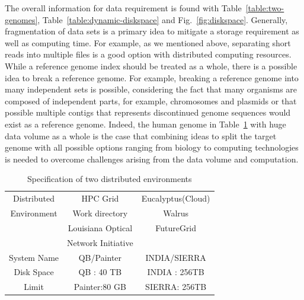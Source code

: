 \documentclass{acm_proc_article-sp}
\begin{document}
The overall information for data requirement is found with Table~\ref{table:two-genomes}, 
Table~\ref{table:dynamic-diskspace} and Fig.~\ref{fig:diskspace}. Generally, fragmentation 
of data sets is a primary idea to mitigate a storage requirement as well as computing time.  
For example, as we mentioned above, separating short reads into multiple files is a good 
option with distributed computing resources.  While a reference genome index should be 
treated as a whole, there is a possible idea to break a reference genome.  For example, 
breaking a reference genome into many independent sets is possible, considering the fact 
that many organisms are composed of independent parts, for example, chromosomes and 
plasmids or that possible multiple contigs that represents discontinued genome sequences
 would exist as a reference genome.  Indeed, the human genome in Table~\ref{table:two-systems} 
 with huge data volume as a whole is the case that combining ideas to split the target genome 
 with all possible options ranging from biology to computing technologies is needed to
 overcome challenges arising from the data volume and computation.   

\begin{table}
\begin{tabular}{|c|cc|} 
\hline 
Distributed &  HPC Grid &  Eucalyptus(Cloud) \\ 
Environment & Work directory & Walrus\\
\hline
 &  Louisiana Optical & FutureGrid \\
& Network Initiative  & \\
System  Name &  QB/Painter   &  INDIA/SIERRA \\
 \hline
 Disk Space  &  QB : 40 TB & INDIA : 256TB \\
  Limit & Painter:80 GB  & SIERRA: 256TB \\

 \hline
 
\end{tabular}
\caption{Specification of two distributed environments}
\label{table:two-systems} 
\end{table}
\end{document}
